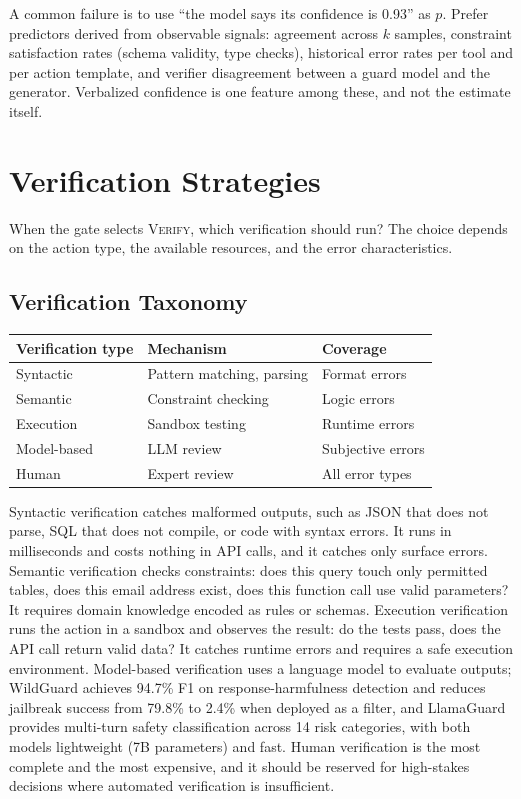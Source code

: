 \documentclass[11pt]{book}
\begin{document}
A common failure is to use ``the model says its confidence is 0.93'' as $p$. Prefer predictors derived from observable signals: agreement across $k$ samples, constraint satisfaction rates (schema validity, type checks), historical error rates per tool and per action template, and verifier disagreement between a guard model and the generator. Verbalized confidence is one feature among these, and not the estimate itself.

\section{Verification Strategies}

When the gate selects \textsc{Verify}, which verification should run? The choice depends on the action type, the available resources, and the error characteristics.

\subsection{Verification Taxonomy}

\begin{center}
\begin{tabular}{lll}
\toprule
Verification type & Mechanism & Coverage \\
\midrule
Syntactic & Pattern matching, parsing & Format errors \\
Semantic & Constraint checking & Logic errors \\
Execution & Sandbox testing & Runtime errors \\
Model-based & LLM review & Subjective errors \\
Human & Expert review & All error types \\
\bottomrule
\end{tabular}
\end{center}

Syntactic verification catches malformed outputs, such as JSON that does not parse, SQL that does not compile, or code with syntax errors. It runs in milliseconds and costs nothing in API calls, and it catches only surface errors. Semantic verification checks constraints: does this query touch only permitted tables, does this email address exist, does this function call use valid parameters? It requires domain knowledge encoded as rules or schemas. Execution verification runs the action in a sandbox and observes the result: do the tests pass, does the API call return valid data? It catches runtime errors and requires a safe execution environment. Model-based verification uses a language model to evaluate outputs; WildGuard \cite{han2024wildguard} achieves 94.7\% F1 on response-harmfulness detection and reduces jailbreak success from 79.8\% to 2.4\% when deployed as a filter, and LlamaGuard provides multi-turn safety classification across 14 risk categories, with both models lightweight (7B parameters) and fast. Human verification is the most complete and the most expensive, and it should be reserved for high-stakes decisions where automated verification is insufficient.
\end{document}

